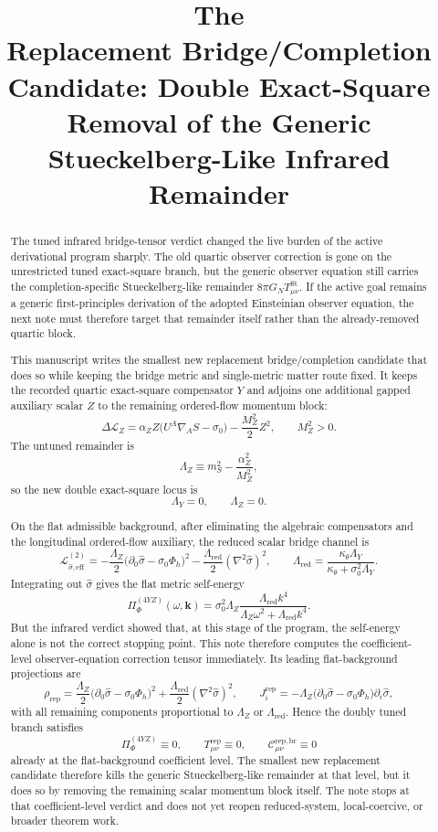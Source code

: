 \documentclass[11pt]{article}
\title{\textbf{The \TheoryName{}}\\[0.4em]
\large Replacement Bridge/Completion Candidate: Double Exact-Square Removal of the Generic Stueckelberg-Like Infrared Remainder}
\author{}
\date{}
\begin{document}
\maketitle

\begin{abstract}
The tuned infrared bridge-tensor verdict changed the live burden of the active derivational program sharply. The old quartic observer correction is gone on the unrestricted tuned exact-square branch, but the generic observer equation still carries the completion-specific Stueckelberg-like remainder \(8\pi G_NT_{\mu\nu}^{\mathrm{St}}\). If the active goal remains a generic first-principles derivation of the adopted Einsteinian observer equation, the next note must therefore target that remainder itself rather than the already-removed quartic block.

This manuscript writes the smallest new replacement bridge/completion candidate that does so while keeping the bridge metric and single-metric matter route fixed. It keeps the recorded quartic exact-square compensator \(Y\) and adjoins one additional gapped auxiliary scalar \(Z\) to the remaining ordered-flow momentum block:
\[
\Delta\mathcal L_Z
=
\alpha_Z Z\bigl(U^A\nabla_A S-\sigma_0\bigr)
-\frac{M_Z^2}{2}Z^2,
\qquad
M_Z^2>0.
\]
The untuned remainder is
\[
\Lambda_Z \equiv m_S^2-\frac{\alpha_Z^2}{M_Z^2},
\]
so the new double exact-square locus is
\[
\Lambda_Y=0,
\qquad
\Lambda_Z=0.
\]

On the flat admissible background, after eliminating the algebraic compensators and the longitudinal ordered-flow auxiliary, the reduced scalar bridge channel is
\[
\mathcal L_{\hat\sigma,\mathrm{eff}}^{(2)}
=
-\frac{\Lambda_Z}{2}\bigl(\partial_0\hat\sigma-\sigma_0\Phi_h\bigr)^2
-\frac{\Lambda_{\mathrm{red}}}{2}(\nabla^2\hat\sigma)^2,
\qquad
\Lambda_{\mathrm{red}}
=
\frac{\kappa_\theta\Lambda_Y}{\kappa_\theta+\sigma_0^2\Lambda_Y}.
\]
Integrating out \(\hat\sigma\) gives the flat metric self-energy
\[
\Pi_{\Phi}^{(4YZ)}(\omega,\mathbf{k})
=
\sigma_0^2\Lambda_Z
\frac{\Lambda_{\mathrm{red}}k^4}{\Lambda_Z\omega^2+\Lambda_{\mathrm{red}}k^4}.
\]
But the infrared verdict showed that, at this stage of the program, the self-energy alone is not the correct stopping point. This note therefore computes the coefficient-level observer-equation correction tensor immediately. Its leading flat-background projections are
\[
\rho_{\mathrm{rep}}
=
\frac{\Lambda_Z}{2}\bigl(\partial_0\hat\sigma-\sigma_0\Phi_h\bigr)^2
+\frac{\Lambda_{\mathrm{red}}}{2}(\nabla^2\hat\sigma)^2,
\qquad
J_i^{\mathrm{rep}}
=
-\Lambda_Z\bigl(\partial_0\hat\sigma-\sigma_0\Phi_h\bigr)\partial_i\hat\sigma,
\]
with all remaining components proportional to \(\Lambda_Z\) or \(\Lambda_{\mathrm{red}}\). Hence the doubly tuned branch satisfies
\[
\Pi_{\Phi}^{(4YZ)}\equiv 0,
\qquad
T_{\mu\nu}^{\mathrm{rep}}\equiv 0,
\qquad
\mathcal C_{\mu\nu}^{\mathrm{rep,br}}\equiv 0
\]
already at the flat-background coefficient level. The smallest new replacement candidate therefore kills the generic Stueckelberg-like remainder at that level, but it does so by removing the remaining scalar momentum block itself. The note stops at that coefficient-level verdict and does not yet reopen reduced-system, local-coercive, or broader theorem work.
\end{abstract}
\end{document}
